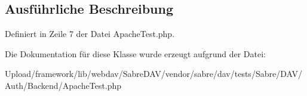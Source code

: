 \subsection{Ausführliche Beschreibung}


Definiert in Zeile 7 der Datei Apache\+Test.\+php.



Die Dokumentation für diese Klasse wurde erzeugt aufgrund der Datei\+:\begin{DoxyCompactItemize}
\item 
Upload/framework/lib/webdav/\+Sabre\+D\+A\+V/vendor/sabre/dav/tests/\+Sabre/\+D\+A\+V/\+Auth/\+Backend/Apache\+Test.\+php\end{DoxyCompactItemize}

